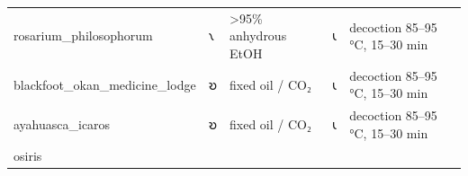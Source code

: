 \begin{longtable}[]{@{}lllll@{}}
\begin{minipage}[t]{0.17\columnwidth}
rosarium\_philosophorum\strut
\end{minipage} & \begin{minipage}[t]{0.17\columnwidth}\raggedright
𐑯\strut
\end{minipage} & \begin{minipage}[t]{0.17\columnwidth}\raggedright
\textgreater95\% anhydrous EtOH\strut
\end{minipage} & \begin{minipage}[t]{0.17\columnwidth}\raggedright
𐑧\strut
\end{minipage} & \begin{minipage}[t]{0.17\columnwidth}\raggedright
decoction 85--95 °C, 15--30 min\strut
\end{minipage}\tabularnewline
\begin{minipage}[t]{0.17\columnwidth}\raggedright
blackfoot\_okan\_medicine\_lodge\strut
\end{minipage} & \begin{minipage}[t]{0.17\columnwidth}\raggedright
𐑹\strut
\end{minipage} & \begin{minipage}[t]{0.17\columnwidth}\raggedright
fixed oil / CO₂\strut
\end{minipage} & \begin{minipage}[t]{0.17\columnwidth}\raggedright
𐑧\strut
\end{minipage} & \begin{minipage}[t]{0.17\columnwidth}\raggedright
decoction 85--95 °C, 15--30 min\strut
\end{minipage}\tabularnewline
\begin{minipage}[t]{0.17\columnwidth}\raggedright
ayahuasca\_icaros\strut
\end{minipage} & \begin{minipage}[t]{0.17\columnwidth}\raggedright
𐑹\strut
\end{minipage} & \begin{minipage}[t]{0.17\columnwidth}\raggedright
fixed oil / CO₂\strut
\end{minipage} & \begin{minipage}[t]{0.17\columnwidth}\raggedright
𐑧\strut
\end{minipage} & \begin{minipage}[t]{0.17\columnwidth}\raggedright
decoction 85--95 °C, 15--30 min\strut
\end{minipage}\tabularnewline
\begin{minipage}[t]{0.17\columnwidth}\raggedright
osiris\strut
\end{minipage} & \begin{minipage}[t]{0.17\columnwidth}\raggedright

\end{minipage}
\end{longtable}
